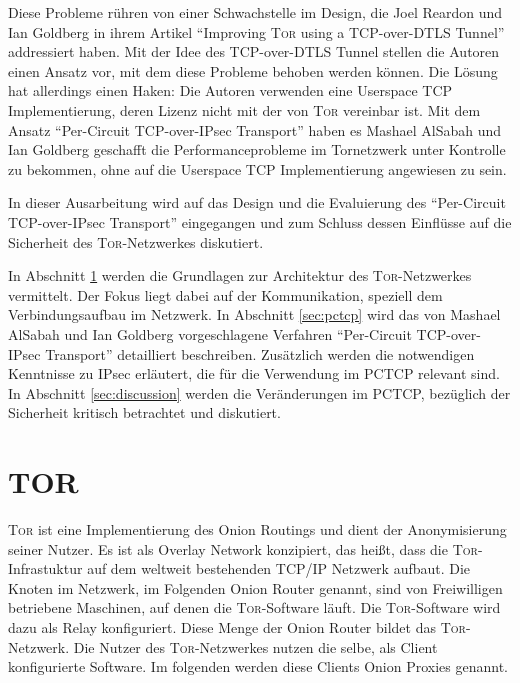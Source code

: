 \documentclass[fleqn,envcountsame,runningheads,10pt,a4paper]{llncs}
\begin{document}
Diese Probleme rühren von einer Schwachstelle im Design, die Joel Reardon und Ian Goldberg in ihrem Artikel ``Improving \textsc{Tor} using a TCP-over-DTLS Tunnel'' addressiert haben. Mit der Idee des TCP-over-DTLS Tunnel stellen die Autoren einen Ansatz vor, mit dem diese Probleme behoben werden können. Die Lösung hat allerdings einen Haken: Die Autoren verwenden eine Userspace TCP Implementierung, deren Lizenz nicht mit der von \textsc{Tor} vereinbar ist. Mit dem Ansatz ``Per-Circuit TCP-over-IPsec Transport'' haben es Mashael AlSabah und Ian Goldberg geschafft die Performanceprobleme im Tornetzwerk unter Kontrolle zu bekommen, ohne auf die Userspace TCP Implementierung angewiesen zu sein.

In dieser Ausarbeitung wird auf das Design und die Evaluierung des ``Per-Circuit TCP-over-IPsec Transport'' eingegangen und zum Schluss dessen Einflüsse auf die Sicherheit des \textsc{Tor}-Netzwerkes diskutiert.

In Abschnitt \ref{sec:tor} werden die Grundlagen zur Architektur des \textsc{Tor}-Netzwerkes vermittelt.
Der Fokus liegt dabei auf der Kommunikation, speziell dem Verbindungsaufbau im Netzwerk. In Abschnitt \ref{sec:pctcp} wird das von Mashael AlSabah und Ian Goldberg vorgeschlagene Verfahren ``Per-Circuit TCP-over-IPsec Transport'' detailliert beschreiben. Zusätzlich werden die notwendigen Kenntnisse zu IPsec erläutert, die für die Verwendung im PCTCP relevant sind. In Abschnitt \ref{sec:discussion} werden die Veränderungen im PCTCP, bezüglich der Sicherheit kritisch betrachtet und diskutiert.

\newpage
\section{TOR}
\label{sec:tor}



\textsc{Tor} ist eine Implementierung des Onion Routings und dient der Anonymisierung seiner Nutzer.
Es ist als Overlay Network konzipiert, das heißt, dass die \textsc{Tor}-Infrastuktur auf dem weltweit bestehenden TCP/IP Netzwerk aufbaut.
Die Knoten im Netzwerk, im Folgenden Onion Router genannt, sind von Freiwilligen betriebene Maschinen, auf denen die \textsc{Tor}-Software läuft. Die \textsc{Tor}-Software wird dazu als Relay konfiguriert.
Diese Menge der Onion Router bildet das \textsc{Tor}-Netzwerk.
Die Nutzer des \textsc{Tor}-Netzwerkes nutzen die selbe, als Client konfigurierte Software.
Im folgenden werden diese Clients Onion Proxies genannt.
\end{document}

